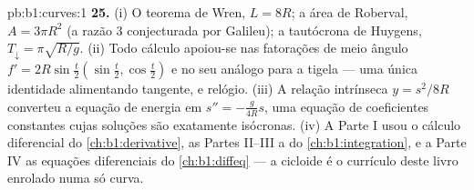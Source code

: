 \begin{solution}{pb:b1:curves:1}
\textbf{25.} (i) O teorema de Wren, $L = 8R$; a área de Roberval,
$A =
3\pi R^2$ (a razão $3$ conjecturada por Galileu); a tautócrona de
Huygens, $T_\downarrow = \pi\sqrt{R/g}$. (ii) Todo cálculo apoiou-se nas fatorações de meio
ângulo $f' =
2R\sin\frac t2(\sin\frac t2, \cos\frac t2)$ e no seu análogo para a tigela --- uma única identidade
alimentando tangente,  e relógio. (iii) A relação
intrínseca $y = s^2/8R$ converteu a equação de energia em $s'' = -\frac{g}{4R}s$, uma equação
 de coeficientes constantes cujas soluções são exatamente
isócronas. (iv) A Parte I usou o cálculo diferencial do \cref{ch:b1:derivative}, as
Partes II--III a  do \cref{ch:b1:integration}, e a Parte IV as equações
diferenciais do \cref{ch:b1:diffeq} --- a cicloide é o currículo deste livro
enrolado numa só curva.
\end{solution}
